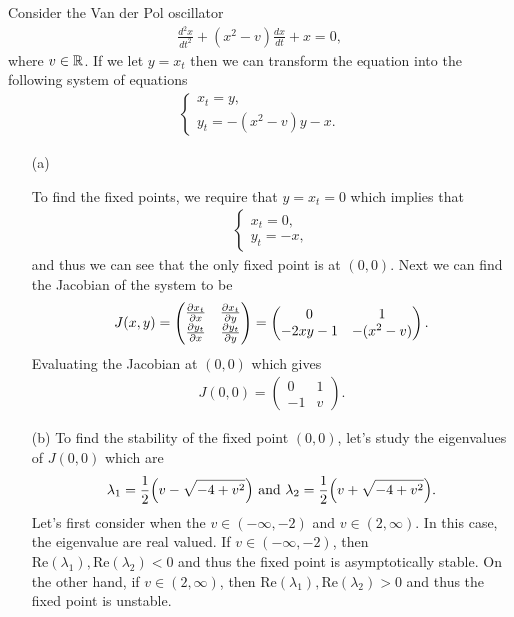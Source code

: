 \documentclass[12pt]{report}
\begin{document}
\begin{solution}
    
    \noindent
    Consider the Van der Pol oscillator 
    \begin{align*}
        \frac{d^2x}{dt^2} + (x^2 - v) \frac{dx}{dt} + x =0,
    \end{align*}
    where $v \in {\mathbb R}$. If we let $y = x_t$ then we can transform the equation into the following system of equations
    \begin{align*}
        \begin{cases}
            x_t = y,\\
            y_t = -(x^2 - v) y - x.
        \end{cases}
    \end{align*}
    \begin{enumerate}
        \item [(a)]
        
        To find the fixed points, we require that $y = x_t = 0$ which implies that
    \begin{align*}
        \begin{cases}
            x_t = 0,\\
            y_t = - x,
        \end{cases}
    \end{align*}
    and thus we can see that the only fixed point is at $(0,0)$. Next we can find the Jacobian of the system to be
    \begin{align*}
        J(x,y) = \begin{pmatrix}
            \frac{\partial x_t}{\partial x} & \frac{\partial x_t}{\partial y}\\
            \frac{\partial y_t}{\partial x} & \frac{\partial y_t}{\partial y}
        \end{pmatrix} = \begin{pmatrix}
            0 & 1\\
            -2xy - 1 & -(x^2 - v)
        \end{pmatrix}.
    \end{align*}
    Evaluating the Jacobian at $(0,0)$ which gives
    \begin{align*}
        J(0,0) = \begin{pmatrix}
            0 & 1\\
            -1 & v
        \end{pmatrix}.
    \end{align*}

        \item [(b)]
        To find the stability of the fixed point $(0,0)$, let's study the eigenvalues of $J(0,0)$ which are
        \[ 
            \lambda_1 = \frac{1}{2}{\left(v - \sqrt{-4 + v^2}\right)} {~\text{and}~} \lambda_2 = \frac{1}{2}{\left(v + \sqrt{-4 + v^2}\right)}.
        \]
        Let's first consider when the $v \in (-\infty,-2)$ and $v \in (2, \infty)$. In this case, the eigenvalue are real valued. If $v \in (-\infty,-2)$, then $\text{Re}(\lambda_1),\text{Re}(\lambda_2) < 0$ and thus the fixed point is asymptotically stable. On the other hand, if $v \in (2,\infty)$, then $\text{Re}(\lambda_1),\text{Re}(\lambda_2) > 0$ and thus the fixed point is unstable.


\end{enumerate}
\end{solution}
\end{document}
